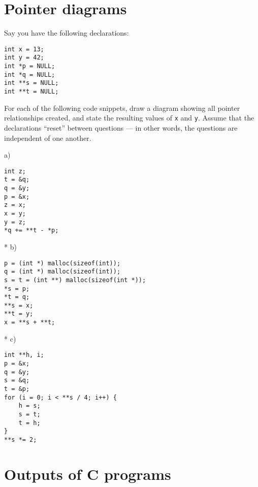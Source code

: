 \documentclass[a4paper,12pt]{article}
\begin{document}
\newpage

\section{Pointer diagrams}

Say you have the following declarations:

\begin{lstlisting}
int x = 13;
int y = 42;
int *p = NULL;
int *q = NULL;
int **s = NULL;
int **t = NULL;
\end{lstlisting}

For each of the following code snippets, draw a diagram showing all
pointer relationships created, and state the resulting values of
\texttt{x} and \texttt{y}. Assume that the declarations ``reset''
between questions --- in other words, the questions are independent of
one another.

a)


\begin{lstlisting}
int z;
t = &q;
q = &y;
p = &x;
z = x;
x = y;
y = z;
*q += **t - *p;
\end{lstlisting}

* b)


\begin{lstlisting}
p = (int *) malloc(sizeof(int));
q = (int *) malloc(sizeof(int));
s = t = (int **) malloc(sizeof(int *));
*s = p;
*t = q;
**s = x;
**t = y;
x = **s + **t;
\end{lstlisting}

* c)


\begin{lstlisting}
int **h, i;
p = &x;
q = &y;
s = &q;
t = &p;
for (i = 0; i < **s / 4; i++) {
	h = s;
	s = t;
	t = h;
}
**s *= 2;
\end{lstlisting}

\newpage

\section{Outputs of C programs}
\end{document}
